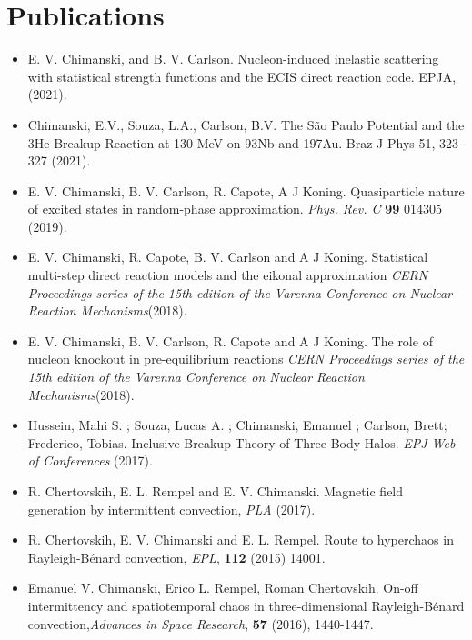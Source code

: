 \documentclass[12pt,a4paper,sans]{moderncv}
\begin{document}
%
%

\section{Publications}
{
  \begin{itemize}
    \item E. V. Chimanski, and  B. V. Carlson. Nucleon-induced inelastic scattering with statistical strength functions and the ECIS direct reaction code. EPJA, (2021).
  \item Chimanski, E.V., Souza, L.A., Carlson, B.V. The S\~ao Paulo Potential and the 3He Breakup Reaction at 130 MeV on 93Nb and 197Au. Braz J Phys 51, 323-327 (2021).
  \item E. V. Chimanski, B. V. Carlson, R. Capote, A J Koning. Quasiparticle nature of excited states in random-phase approximation. \textit{Phys. Rev. C} \textbf{99} 014305 (2019).
  \item E. V. Chimanski, R. Capote, B. V. Carlson and A J Koning. Statistical multi-step direct reaction models and the eikonal approximation \textit{CERN Proceedings series of the 15th edition of the Varenna Conference on Nuclear Reaction Mechanisms}(2018).
  \item E. V. Chimanski, B. V. Carlson, R. Capote and A J Koning. The role of nucleon knockout in pre-equilibrium reactions \textit{CERN Proceedings series of the 15th edition of the Varenna Conference on Nuclear Reaction Mechanisms}(2018).
  \item Hussein, Mahi S. ; Souza, Lucas A. ; Chimanski, Emanuel ; Carlson, Brett; Frederico, Tobias. Inclusive Breakup Theory of Three-Body Halos. \textit {EPJ Web of Conferences} (2017).
  \item R. Chertovskih, E. L. Rempel and E. V. Chimanski. Magnetic field generation by intermittent convection, \textit{PLA} (2017).
  \item R. Chertovskih, E. V. Chimanski and E. L. Rempel. Route to hyperchaos in Rayleigh-B{\'e}nard convection, \textit{EPL}, \textbf{112} (2015) 14001.
  \item Emanuel V. Chimanski, Erico L. Rempel, Roman Chertovskih. On-off intermittency and spatiotemporal chaos in three-dimensional Rayleigh-B{\'e}nard convection,\textit{Advances in Space Research}, \textbf{57} (2016), 1440-1447.
  \end{itemize}
}
\end{document}
